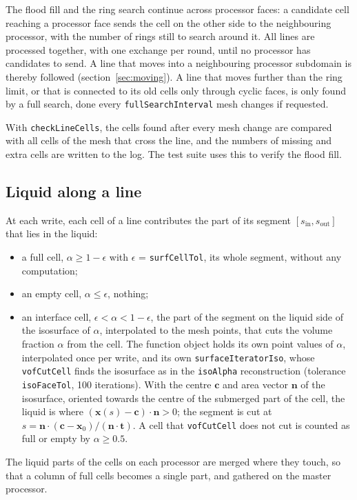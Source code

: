 \documentclass[11pt,a4paper]{article}
\begin{document}
The flood fill and the ring search continue across processor faces: a
candidate cell reaching a processor face sends the cell on the other side to
the neighbouring processor, with the number of rings still to search around
it. All lines are processed together, with one exchange per round, until no
processor has candidates to send. A line that moves into a neighbouring
processor subdomain is thereby followed (section~\ref{sec:moving}). A line
that moves further than the ring limit, or that is connected to its old cells
only through cyclic faces, is only found by a full search, done every
\texttt{fullSearchInterval} mesh changes if requested.

With \texttt{checkLineCells}, the cells found after every mesh change are
compared with all cells of the mesh that cross the line, and the numbers of
missing and extra cells are written to the log. The test suite uses this to
verify the flood fill.

\subsection{Liquid along a line}
At each write, each cell of a line contributes the part of its segment
$[s_\mathrm{in}, s_\mathrm{out}]$ that lies in the liquid:
\begin{itemize}
\item a full cell, $\alpha \ge 1 - \epsilon$ with
  $\epsilon$ = \texttt{surfCellTol}, its whole segment, without any
  computation;
\item an empty cell, $\alpha \le \epsilon$, nothing;
\item an interface cell, $\epsilon < \alpha < 1 - \epsilon$, the part of the
  segment on the liquid side of the isosurface of $\alpha$, interpolated to the
  mesh points, that cuts the volume fraction $\alpha$ from the cell. The
  function object holds its own point values of $\alpha$, interpolated once
  per write, and its own \texttt{surfaceIteratorIso}, whose
  \texttt{vofCutCell} finds the isosurface as in the \texttt{isoAlpha}
  reconstruction (tolerance \texttt{isoFaceTol}, 100 iterations). With the
  centre $\mathbf{c}$ and area vector $\mathbf{n}$ of the isosurface, oriented
  towards the centre of the submerged part of the cell, the liquid is where
  $(\mathbf{x}(s) - \mathbf{c})\cdot\mathbf{n} > 0$; the segment is cut at
  $s = \mathbf{n}\cdot(\mathbf{c} - \mathbf{x}_0)/(\mathbf{n}\cdot\mathbf{t})$.
  A cell that \texttt{vofCutCell} does not cut is counted as full or empty by
  $\alpha \ge 0.5$.
\end{itemize}
The liquid parts of the cells on each processor are merged where they touch,
so that a column of full cells becomes a single part, and gathered on the
master processor.
\end{document}
